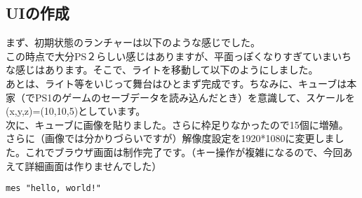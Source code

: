 \documentclass[b5paper,11pt]{jsarticle}
\begin{document}
\begin{multicols*}{3}
\section{UIの作成}
まず、初期状態のランチャーは以下のような感じでした。\\
この時点で大分PS２らしい感じはありますが、平面っぽくなりすぎていまいちな感じはあります。そこで、ライトを移動して以下のようにしました。\\
あとは、ライト等をいじって舞台はひとまず完成です。ちなみに、キューブは本家（でPS1のゲームのセーブデータを読み込んだとき）を意識して、スケールを(x,y,z)=(10,10,5)としています。\\
次に、キューブに画像を貼りました。さらに枠足りなかったので15個に増殖。\\
さらに（画像では分かりづらいですが）解像度設定を1920*1080に変更しました。これでブラウザ画面は制作完了です。（キー操作が複雑になるので、今回あえて詳細画面は作りませんでした）

\begin{lstlisting}[caption=Sample]
mes "hello, world!"
\end{lstlisting}

\end{multicols*}
\end{document}
